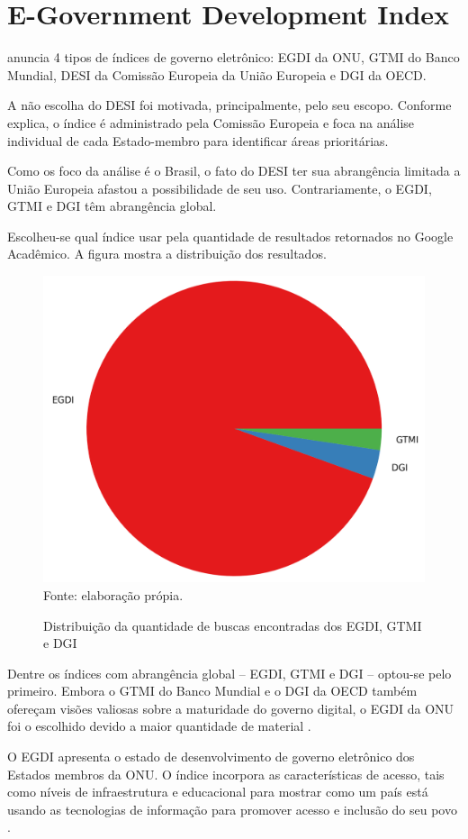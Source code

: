 \chapter{E-Government Development Index}
\label{egdi}

\cite{martinez2022egovernment} anuncia 4 tipos de índices de governo eletrônico: EGDI da ONU, GTMI do Banco Mundial, DESI da Comissão Europeia da União Europeia e DGI da OECD.

A não escolha do DESI foi motivada, principalmente, pelo seu escopo. Conforme \cite{desi_2022} explica, o índice é administrado pela Comissão Europeia e foca na análise individual de cada Estado-membro para identificar áreas prioritárias.

Como os foco da análise é o Brasil, o fato do DESI ter sua abrangência limitada a União Europeia afastou a possibilidade de seu uso. Contrariamente, o EGDI, GTMI e DGI têm abrangência global.

Escolheu-se qual índice usar pela quantidade de resultados retornados no Google Acadêmico. A figura mostra a distribuição dos resultados.

\begin{figure}[H]
	\centering
	\caption{Distribuição da quantidade de buscas encontradas dos EGDI, GTMI e DGI}
	\includegraphics[width=0.6\linewidth]{figuras/indices/indices_google_academico}
	\label{fig:indices_google_academico}
	\\ \footnotesize{Fonte: elaboração própia.}
\end{figure}

Dentre os índices com abrangência global – EGDI, GTMI e DGI – optou-se pelo primeiro. Embora o GTMI do Banco Mundial e o DGI da OECD também ofereçam visões valiosas sobre a maturidade do governo digital, o EGDI da ONU foi o escolhido devido a maior quantidade de material .

O EGDI apresenta o estado de desenvolvimento de governo eletrônico dos Estados membros da ONU. O índice incorpora as características de acesso, tais como níveis de infraestrutura e educacional para mostrar como um país está usando as tecnologias de informação para promover acesso e inclusão do seu povo \cite{ONU_EGDI}.

